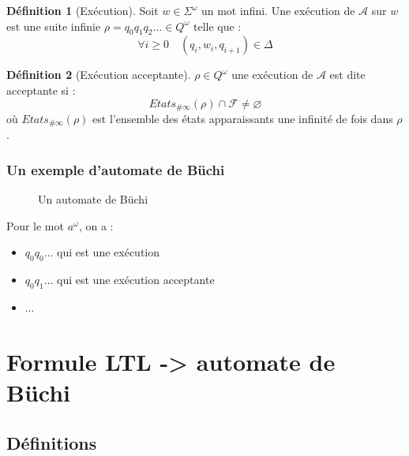 \documentclass{beamer}
\theoremstyle{plain}
\theoremstyle{definition}
\newtheorem{defi}{Définition}
\begin{document}
\begin{frame}[<+->]
  \begin{defi}[Exécution]
    Soit $w \in \Sigma^\omega$ un mot infini.
    Une exécution de $\mathcal{A}$ sur $w$ est une suite infinie $\rho = q_0q_1q_2\dots \in Q^\omega$ telle que :
    \[
      \forall i \geq 0 \quad (q_i, w_i, q_{i+1}) \in \Delta
    \]
  \end{defi}
  
  \begin{defi}[Exécution acceptante]
    $\rho \in Q^\omega$ une exécution de $\mathcal{A}$ est dite acceptante si :
    \[
      Etats_{\#\infty}(\rho) \cap \mathscr{F} \neq \varnothing
    \]
    où $Etats_{\#\infty}(\rho)$ est l'ensemble des états apparaissants une infinité de fois dans $\rho$.
  \end{defi}
\end{frame}


\begin{frame}
  \frametitle{Un exemple d'automate de Büchi}

  \begin{figure}
    \centering
    \caption{Un automate de Büchi}
  \end{figure}

  Pour le mot $a^\omega$, on a :
  \begin{itemize}
  \item $q_0q_0\dots$ qui est une exécution
    \pause
  \item $q_0q_1\dots$ qui est une exécution acceptante
    \pause
  \item ...
  \end{itemize}
\end{frame}

\section{Formule LTL -> automate de Büchi}
\subsection{Définitions}
\end{document}
